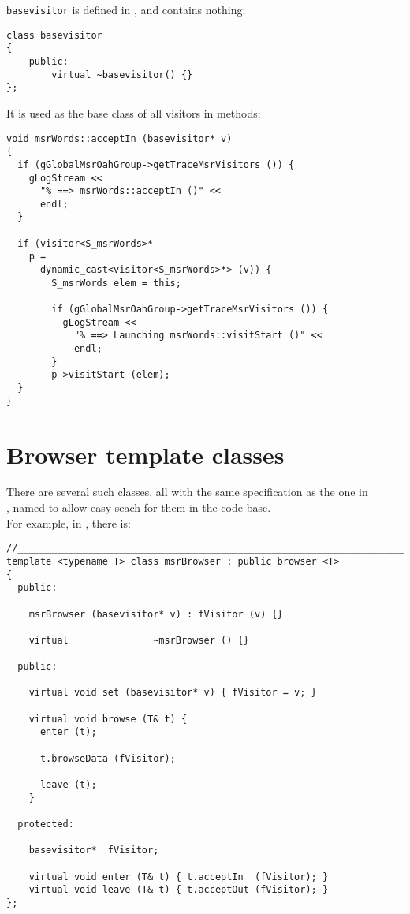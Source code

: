 {\tt basevisitor} is defined in , and contains nothing:
\begin{lstlisting}[language=CPlusPlus]
class basevisitor
{
	public:
		virtual ~basevisitor() {}
};
\end{lstlisting}

It is used as the base class of all visitors in  methods:
\begin{lstlisting}[language=CPlusPlus]
void msrWords::acceptIn (basevisitor* v)
{
  if (gGlobalMsrOahGroup->getTraceMsrVisitors ()) {
    gLogStream <<
      "% ==> msrWords::acceptIn ()" <<
      endl;
  }

  if (visitor<S_msrWords>*
    p =
      dynamic_cast<visitor<S_msrWords>*> (v)) {
        S_msrWords elem = this;

        if (gGlobalMsrOahGroup->getTraceMsrVisitors ()) {
          gLogStream <<
            "% ==> Launching msrWords::visitStart ()" <<
            endl;
        }
        p->visitStart (elem);
  }
}
\end{lstlisting}


\section{Browser template classes}

There are several such classes, all with the same specification as the one in\\
, named to allow easy seach for them in the code base.\\
For example, in , there is:
\begin{lstlisting}[language=CPlusPlus]
//______________________________________________________________________________
template <typename T> class msrBrowser : public browser <T>
{
  public:

    msrBrowser (basevisitor* v) : fVisitor (v) {}

    virtual               ~msrBrowser () {}

  public:

    virtual void set (basevisitor* v) { fVisitor = v; }

    virtual void browse (T& t) {
      enter (t);

      t.browseData (fVisitor);

      leave (t);
    }

  protected:

    basevisitor*  fVisitor;

    virtual void enter (T& t) { t.acceptIn  (fVisitor); }
    virtual void leave (T& t) { t.acceptOut (fVisitor); }
};
\end{lstlisting}


